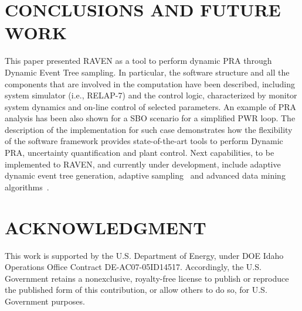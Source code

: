 \documentclass{mc2013}
\begin{document}
\section{CONCLUSIONS AND FUTURE WORK}
This paper presented RAVEN as a tool to perform dynamic PRA through Dynamic Event Tree sampling. In particular, the software structure and all the components that are involved in the computation have been described, including system simulator (i.e., RELAP-7) and the control logic, characterized by monitor system dynamics and on-line control of selected parameters.
An example of PRA analysis has been also shown for a SBO scenario for a simplified PWR loop. 
The description of the implementation for such case demonstrates how the flexibility of the software framework provides state-of-the-art tools to perform Dynamic PRA, uncertainty quantification and plant control. 
Next capabilities, to be implemented to RAVEN, and currently under development, include adaptive dynamic event tree generation, adaptive sampling~\cite{mandelliSVMANS} and advanced data mining algorithms~\cite{mandelliEsrel2011}. 
\section*{ACKNOWLEDGMENT}
This work is supported by the U.S. Department of Energy, under DOE Idaho Operations Office Contract DE-AC07-05ID14517. Accordingly, the U.S. Government retains a nonexclusive, royalty-free license to publish or reproduce the published form of this contribution, or allow others to do so, for U.S. Government purposes.



\end{document}

